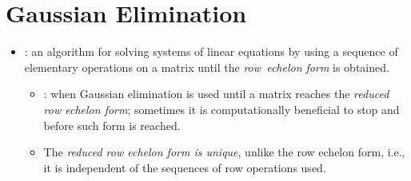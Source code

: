 \section{Gaussian Elimination}\label{Gaussian Elimination}
\begin{itemize}
  \item {}: an algorithm for solving systems of linear equations by using a sequence of elementary operations on a matrix until the \emph{row~echelon form} is obtained.
  \begin{itemize}
    \item {}: when Gaussian elimination is used until a matrix reaches the \emph{reduced row echelon form}; sometimes it is computationally beneficial to stop and before such form is reached.
    \item The \emph{reduced row echelon form is unique}, unlike the row echelon form, i.e., it is independent of the sequences of row operations used.
  \end{itemize}

\end{itemize}

